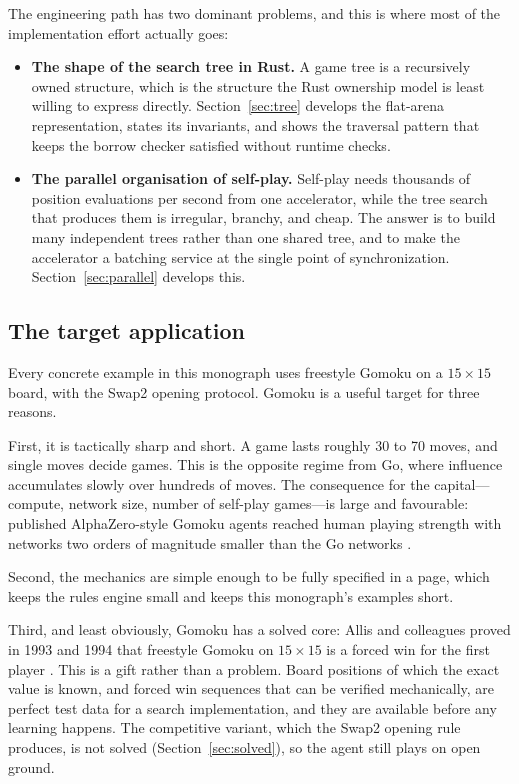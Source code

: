 The engineering path has two dominant problems, and this is where most of the
implementation effort actually goes:

\begin{itemize}
  \item \textbf{The shape of the search tree in Rust.} A game tree is a
        recursively owned structure, which is the structure the Rust ownership
        model is least willing to express directly. Section~\ref{sec:tree}
        develops the flat-arena representation, states its invariants, and shows
        the traversal pattern that keeps the borrow checker satisfied without
        runtime checks.
  \item \textbf{The parallel organisation of self-play.} Self-play needs
        thousands of position evaluations per second from one accelerator, while
        the tree search that produces them is irregular, branchy, and cheap. The
        answer is to build many independent trees rather than one shared tree, and
        to make the accelerator a batching service at the single point of
        synchronization. Section~\ref{sec:parallel} develops this.
\end{itemize}

\subsection{The target application}

Every concrete example in this monograph uses freestyle Gomoku on a
$15\times15$ board, with the Swap2 opening protocol. Gomoku is a useful target
for three reasons.

First, it is tactically sharp and short. A game lasts roughly 30 to 70 moves,
and single moves decide games. This is the opposite regime from Go, where
influence accumulates slowly over hundreds of moves. The consequence for the
capital---compute, network size, number of self-play games---is large and
favourable: published AlphaZero-style Gomoku agents reached human playing
strength with networks two orders of magnitude smaller than the Go networks
\citep{xie2018alphagomoku}.

Second, the mechanics are simple enough to be fully specified in a page, which
keeps the rules engine small and keeps this monograph's examples short.

Third, and least obviously, Gomoku has a solved core: Allis and colleagues
proved in 1993 and 1994 that freestyle Gomoku on $15\times15$ is a forced win for
the first player \citep{allis1996gomoku,allis1994thesis}. This is a gift rather
than a problem. Board positions of which the exact value is known, and forced
win sequences that can be verified mechanically, are perfect test data for a
search implementation, and they are available before any learning happens. The
competitive variant, which the Swap2 opening rule produces, is not solved
(Section~\ref{sec:solved}), so the agent still plays on open ground.

